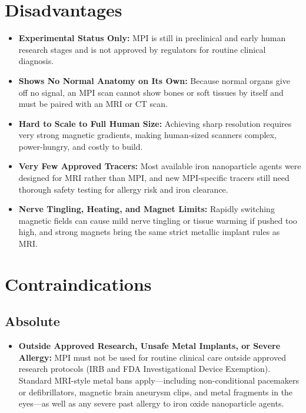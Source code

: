 \section{Disadvantages}

\begin{itemize}
    \item \textbf{Experimental Status Only:} MPI is still in preclinical and early human research stages and is not approved by regulators for routine clinical diagnosis.
    \item \textbf{Shows No Normal Anatomy on Its Own:} Because normal organs give off no signal, an MPI scan cannot show bones or soft tissues by itself and must be paired with an MRI or CT scan.
    \item \textbf{Hard to Scale to Full Human Size:} Achieving sharp resolution requires very strong magnetic gradients, making human-sized scanners complex, power-hungry, and costly to build.
    \item \textbf{Very Few Approved Tracers:} Most available iron nanoparticle agents were designed for MRI rather than MPI, and new MPI-specific tracers still need thorough safety testing for allergy risk and iron clearance.
    \item \textbf{Nerve Tingling, Heating, and Magnet Limits:} Rapidly switching magnetic fields can cause mild nerve tingling or tissue warming if pushed too high, and strong magnets bring the same strict metallic implant rules as MRI.
\end{itemize}

\section{Contraindications}

\subsection{Absolute}

\begin{itemize}
    \item \textbf{Outside Approved Research, Unsafe Metal Implants, or Severe Allergy:} MPI must not be used for routine clinical care outside approved research protocols (IRB and FDA Investigational Device Exemption). Standard MRI-style metal bans apply---including non-conditional pacemakers or defibrillators, magnetic brain aneurysm clips, and metal fragments in the eyes---as well as any severe past allergy to iron oxide nanoparticle agents.
\end{itemize}

